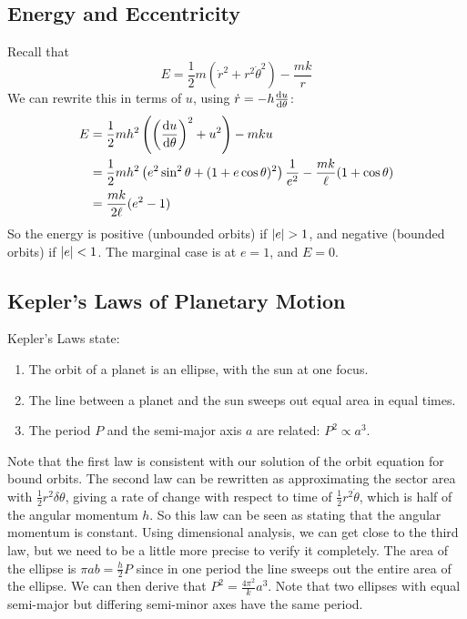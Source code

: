 \subsection{Energy and Eccentricity}
Recall that
\[
	E = \frac{1}{2}m\left( \dot r^2 + r^2 \dot\theta^2 \right) - \frac{mk}{r}
\]
We can rewrite this in terms of \(u\), using \(\dot r = -h\dv{u}{\theta}\):
\begin{align*}
	E & = \frac{1}{2}mh^2\left( \left( \dv{u}{\theta} \right)^2 + u^2 \right) - mku                                      \\
	  & = \frac{1}{2}mh^2\left( e^2\sin^2\theta + (1+e\cos\theta)^2 \right)\frac{1}{e^2} - \frac{mk}{\ell}(1+\cos\theta) \\
	  & = \frac{mk}{2\ell}(e^2 - 1)
\end{align*}
So the energy is positive (unbounded orbits) if \(\abs{e} > 1\), and negative (bounded orbits) if \(\abs{e} < 1\).
The marginal case is at \(e = 1\), and \(E = 0\).

\subsection{Kepler's Laws of Planetary Motion}
Kepler's Laws state:
\begin{enumerate}
	\item The orbit of a planet is an ellipse, with the sun at one focus.
	\item The line between a planet and the sun sweeps out equal area in equal times.
	\item The period \(P\) and the semi-major axis \(a\) are related: \(P^2 \propto a^3\).
\end{enumerate}
Note that the first law is consistent with our solution of the orbit equation for bound orbits.
The second law can be rewritten as approximating the sector area with \(\frac{1}{2}r^2\delta\theta\), giving a rate of change with respect to time of \(\frac{1}{2}r^2\dot\theta\), which is half of the angular momentum \(h\).
So this law can be seen as stating that the angular momentum is constant.
Using dimensional analysis, we can get close to the third law, but we need to be a little more precise to verify it completely.
The area of the ellipse is \(\pi a b = \frac{h}{2}P\) since in one period the line sweeps out the entire area of the ellipse.
We can then derive that \(P^2 = \frac{4\pi^2}{k}a^3\).
Note that two ellipses with equal semi-major but differing semi-minor axes have the same period.
